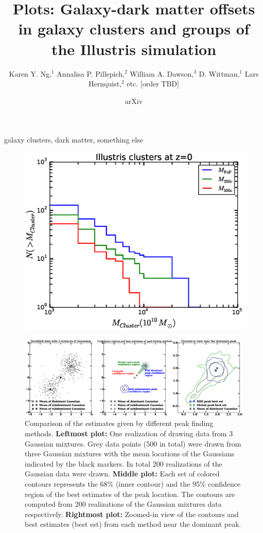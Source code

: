 \documentclass[letterpaper,useAMS,usenatbib]{mn2e}
\title[
	Galaxy-dark matter offsets in galaxy clusters and groups of the
Illustris simulation
]
{Plots: Galaxy-dark matter offsets in galaxy clusters and groups of the
Illustris simulation}
\author[Karen Y. Ng et al.]{Karen Y. Ng,$^{1}$
	Annalisa P. Pillepich,$^{2}$ 
	William A. Dawson,$^{3}$ 
	D. Wittman,$^{1}$
	\newauthor Lars Hernquist,$^{2}$
	etc. [order TBD]
}
\begin{document}
\date{arXiv} \pagerange{\pageref{firstpage}--\pageref{lastpage}}
 \maketitle\label{firstpage}
\begin{abstract} 
\end{abstract}
\begin{keywords}
	galaxy clusters, dark matter, something else 
\end{keywords}
\begin{figure}
	\includegraphics[width=.95\linewidth]{clusterMassDist.eps}
	\caption{
		\label{fig:config}}
\end{figure}
\begin{figure}
	\includegraphics[width=.95\linewidth]{confidence_regions_dumbbell_500.eps}
	\caption{Comparison of the estimates given by different peak finding methods.
		{\bf Leftmost plot:} One realization of drawing data from 3 Gaussian
		mixtures. Grey data points (500 in total) were drawn from three
		Gaussian mixtures with the mean locations of the Gaussians indicated by the
		black markers. In total 200 realizations of the Gaussian data were drawn.
		{\bf Middle plot:} Each set of colored contours represents the
		68\% (inner contour) and the 95\% confidence region of the best estimates
		of the peak location. The contours are computed from 200 realizations of the Gaussian
		mixtures data respectively. {\bf Rightmost plot:} Zoomed-in view of the
		contours and best estimates (best est) from each method near the dominant peak.  
		\label{fig:dumbbell500}}
\end{figure}
\end{document}
